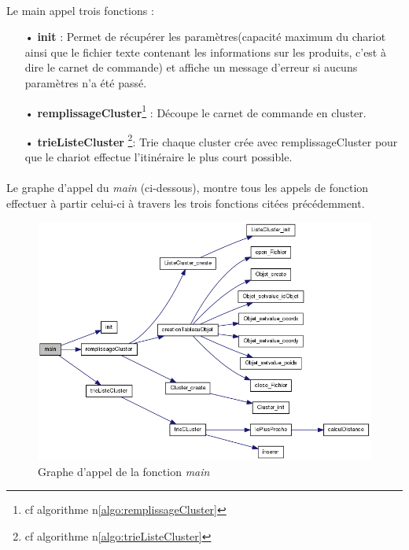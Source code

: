 \documentclass[twoside,UTF8]{EPURapport}
\begin{document}
\paragraph{}
Le main appel trois fonctions : 
\begin{itemize}
\item[•]\textbf{init} : Permet de récupérer les paramètres(capacité maximum du chariot ainsi que le fichier texte contenant les informations sur les produits, c'est à dire le carnet de commande) et affiche un message d'erreur si aucuns paramètres n'a été passé.
\item[•]\textbf{remplissageCluster}\footnote{cf algorithme n\degre \ref{algo:remplissageCluster}} : Découpe le carnet de commande en cluster.
\item[•]\textbf{trieListeCluster} \footnote{cf algorithme n\degre \ref{algo:trieListeCluster}}: Trie chaque cluster crée avec remplissageCluster pour que le chariot effectue l'itinéraire le plus court possible.
\end{itemize}

\paragraph{}
Le graphe d'appel du \textit{main} (ci-dessous), montre tous les appels de fonction effectuer à partir celui-ci à travers les trois fonctions citées précédemment.

\begin{figure}[!h]
	\center
	\includegraphics[scale=0.5]{images/main_appel.png}
	\caption{Graphe d'appel de la fonction \textit{main}}
\end{figure}
\end{document}
